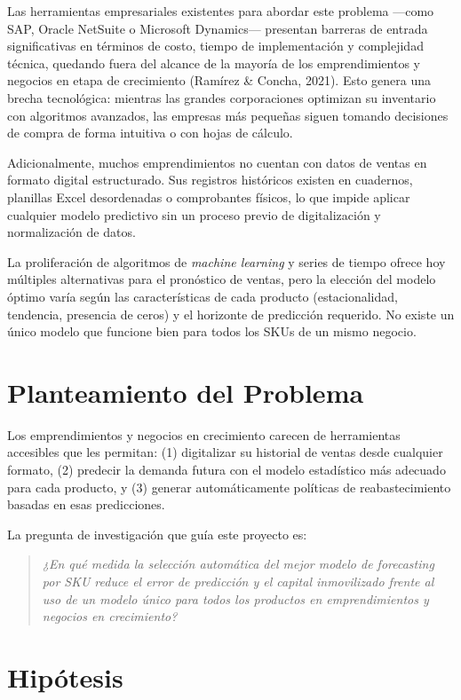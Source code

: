 \documentclass[12pt, a4paper]{report}
\begin{document}
Las herramientas empresariales existentes para abordar este problema —como SAP,
Oracle NetSuite o Microsoft Dynamics— presentan barreras de entrada significativas en
términos de costo, tiempo de implementación y complejidad técnica, quedando fuera del
alcance de la mayoría de los emprendimientos y negocios en etapa de crecimiento
(Ramírez \& Concha, 2021). Esto genera una brecha tecnológica: mientras las grandes
corporaciones optimizan su inventario con algoritmos avanzados, las empresas más
pequeñas siguen tomando decisiones de compra de forma intuitiva o con hojas de cálculo.

Adicionalmente, muchos emprendimientos no cuentan con datos de ventas en formato
digital estructurado. Sus registros históricos existen en cuadernos, planillas Excel
desordenadas o comprobantes físicos, lo que impide aplicar cualquier modelo predictivo
sin un proceso previo de digitalización y normalización de datos.

La proliferación de algoritmos de \textit{machine learning} y series de tiempo ofrece hoy
múltiples alternativas para el pronóstico de ventas, pero la elección del modelo óptimo
varía según las características de cada producto (estacionalidad, tendencia, presencia de
ceros) y el horizonte de predicción requerido. No existe un único modelo que funcione
bien para todos los SKUs de un mismo negocio.

\section{Planteamiento del Problema}

Los emprendimientos y negocios en crecimiento carecen de herramientas accesibles que
les permitan: (1) digitalizar su historial de ventas desde cualquier formato, (2) predecir
la demanda futura con el modelo estadístico más adecuado para cada producto, y (3)
generar automáticamente políticas de reabastecimiento basadas en esas predicciones.

La pregunta de investigación que guía este proyecto es:

\begin{quote}
\textit{¿En qué medida la selección automática del mejor modelo de forecasting por SKU
reduce el error de predicción y el capital inmovilizado frente al uso de un modelo único
para todos los productos en emprendimientos y negocios en crecimiento?}
\end{quote}

\section{Hipótesis}
\end{document}
